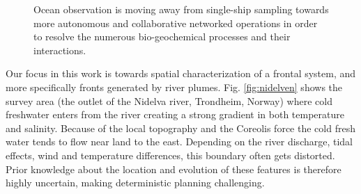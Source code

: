 \documentclass[aoas]{imsart}
\begin{document}
\begin{figure}[!h] 
  \centering 
  \hfill
  \caption{Ocean observation is moving away from single-ship sampling
    towards more autonomous and collaborative networked operations in
    order to resolve the numerous bio-geochemical processes and their
    interactions.}
\label{fig:envir}
\end{figure}


Our focus in this work is towards spatial characterization of a
frontal system, and more specifically fronts generated by river
plumes. Fig. \ref{fig:nidelven} shows the survey area (the outlet of
the Nidelva river, Trondheim, Norway) where cold freshwater enters
from the river creating a strong gradient in both temperature and
salinity. Because of the local topography and the Coreolis force
\citep{coriolis1835memoire} the cold fresh water tends to flow near
land to the east. Depending on the river discharge, tidal effects,
wind and temperature differences, this boundary often gets
distorted. Prior knowledge about the location and evolution of these
features is therefore highly uncertain, making deterministic planning
challenging.
\end{document}
